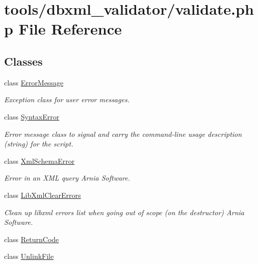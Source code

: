 \hypertarget{validate_8php}{\section{tools/dbxml\+\_\+validator/validate.php File Reference}
\label{validate_8php}
}
\subsection*{Classes}
\begin{DoxyCompactItemize}
\item 
class \hyperlink{classErrorMessage}{Error\+Message}
\begin{DoxyCompactList}\small\item\em Exception class for user error messages. \end{DoxyCompactList}\item 
class \hyperlink{classSyntaxError}{Syntax\+Error}
\begin{DoxyCompactList}\small\item\em Error message class to signal and carry the command-\/line usage description (string) for the script. \end{DoxyCompactList}\item 
class \hyperlink{classXmlSchemaError}{Xml\+Schema\+Error}
\begin{DoxyCompactList}\small\item\em Error in an X\+M\+L query  Arnia Software. \end{DoxyCompactList}\item 
class \hyperlink{classLibXmlClearErrors}{Lib\+Xml\+Clear\+Errors}
\begin{DoxyCompactList}\small\item\em Clean up libxml errors list when going out of scope (on the destructor)  Arnia Software. \end{DoxyCompactList}\item 
class \hyperlink{classReturnCode}{Return\+Code}
\item 
class \hyperlink{classUnlinkFile}{Unlink\+File}
\end{DoxyCompactItemize}
